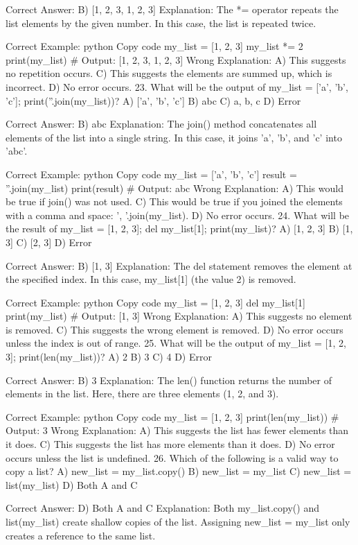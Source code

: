 Correct Answer: B) [1, 2, 3, 1, 2, 3]
Explanation: The *= operator repeats the list elements by the given number. In this case, the list is repeated twice.

Correct Example:
python
Copy code
my_list = [1, 2, 3]
my_list *= 2
print(my_list)  # Output: [1, 2, 3, 1, 2, 3]
Wrong Explanation:
A) This suggests no repetition occurs.
C) This suggests the elements are summed up, which is incorrect.
D) No error occurs.
23. What will be the output of my_list = ['a', 'b', 'c']; print(''.join(my_list))?
A) ['a', 'b', 'c']
B) abc
C) a, b, c
D) Error

Correct Answer: B) abc
Explanation: The join() method concatenates all elements of the list into a single string. In this case, it joins 'a', 'b', and 'c' into 'abc'.

Correct Example:
python
Copy code
my_list = ['a', 'b', 'c']
result = ''.join(my_list)
print(result)  # Output: abc
Wrong Explanation:
A) This would be true if join() was not used.
C) This would be true if you joined the elements with a comma and space: ', '.join(my_list).
D) No error occurs.
24. What will be the result of my_list = [1, 2, 3]; del my_list[1]; print(my_list)?
A) [1, 2, 3]
B) [1, 3]
C) [2, 3]
D) Error

Correct Answer: B) [1, 3]
Explanation: The del statement removes the element at the specified index. In this case, my_list[1] (the value 2) is removed.

Correct Example:
python
Copy code
my_list = [1, 2, 3]
del my_list[1]
print(my_list)  # Output: [1, 3]
Wrong Explanation:
A) This suggests no element is removed.
C) This suggests the wrong element is removed.
D) No error occurs unless the index is out of range.
25. What will be the output of my_list = [1, 2, 3]; print(len(my_list))?
A) 2
B) 3
C) 4
D) Error

Correct Answer: B) 3
Explanation: The len() function returns the number of elements in the list. Here, there are three elements (1, 2, and 3).

Correct Example:
python
Copy code
my_list = [1, 2, 3]
print(len(my_list))  # Output: 3
Wrong Explanation:
A) This suggests the list has fewer elements than it does.
C) This suggests the list has more elements than it does.
D) No error occurs unless the list is undefined.
26. Which of the following is a valid way to copy a list?
A) new_list = my_list.copy()
B) new_list = my_list
C) new_list = list(my_list)
D) Both A and C

Correct Answer: D) Both A and C
Explanation: Both my_list.copy() and list(my_list) create shallow copies of the list. Assigning new_list = my_list only creates a reference to the same list.

